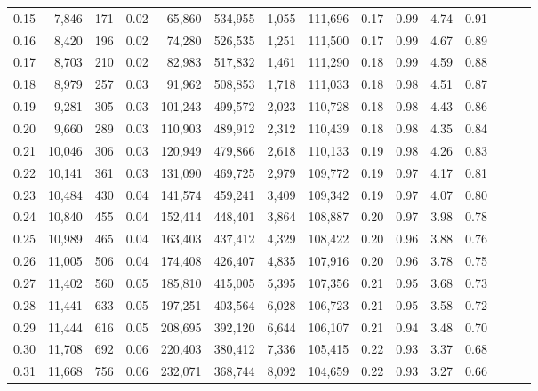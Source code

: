 \begin{tabular}{rrrrrrrrrrrrrrr}
0.15 &   7,846 &    171 &  0.02 &   65,860 &  534,955 &    1,055 &  111,696 &  0.17 &  0.99 &  4.74 &      0.91 \\
0.16 &   8,420 &    196 &  0.02 &   74,280 &  526,535 &    1,251 &  111,500 &  0.17 &  0.99 &  4.67 &      0.89 \\
0.17 &   8,703 &    210 &  0.02 &   82,983 &  517,832 &    1,461 &  111,290 &  0.18 &  0.99 &  4.59 &      0.88 \\
0.18 &   8,979 &    257 &  0.03 &   91,962 &  508,853 &    1,718 &  111,033 &  0.18 &  0.98 &  4.51 &      0.87 \\
0.19 &   9,281 &    305 &  0.03 &  101,243 &  499,572 &    2,023 &  110,728 &  0.18 &  0.98 &  4.43 &      0.86 \\
0.20 &   9,660 &    289 &  0.03 &  110,903 &  489,912 &    2,312 &  110,439 &  0.18 &  0.98 &  4.35 &      0.84 \\
0.21 &  10,046 &    306 &  0.03 &  120,949 &  479,866 &    2,618 &  110,133 &  0.19 &  0.98 &  4.26 &      0.83 \\
0.22 &  10,141 &    361 &  0.03 &  131,090 &  469,725 &    2,979 &  109,772 &  0.19 &  0.97 &  4.17 &      0.81 \\
0.23 &  10,484 &    430 &  0.04 &  141,574 &  459,241 &    3,409 &  109,342 &  0.19 &  0.97 &  4.07 &      0.80 \\
0.24 &  10,840 &    455 &  0.04 &  152,414 &  448,401 &    3,864 &  108,887 &  0.20 &  0.97 &  3.98 &      0.78 \\
0.25 &  10,989 &    465 &  0.04 &  163,403 &  437,412 &    4,329 &  108,422 &  0.20 &  0.96 &  3.88 &      0.76 \\
0.26 &  11,005 &    506 &  0.04 &  174,408 &  426,407 &    4,835 &  107,916 &  0.20 &  0.96 &  3.78 &      0.75 \\
0.27 &  11,402 &    560 &  0.05 &  185,810 &  415,005 &    5,395 &  107,356 &  0.21 &  0.95 &  3.68 &      0.73 \\
0.28 &  11,441 &    633 &  0.05 &  197,251 &  403,564 &    6,028 &  106,723 &  0.21 &  0.95 &  3.58 &      0.72 \\
0.29 &  11,444 &    616 &  0.05 &  208,695 &  392,120 &    6,644 &  106,107 &  0.21 &  0.94 &  3.48 &      0.70 \\
0.30 &  11,708 &    692 &  0.06 &  220,403 &  380,412 &    7,336 &  105,415 &  0.22 &  0.93 &  3.37 &      0.68 \\
0.31 &  11,668 &    756 &  0.06 &  232,071 &  368,744 &    8,092 &  104,659 &  0.22 &  0.93 &  3.27 &      0.66 \\

\end{tabular}
